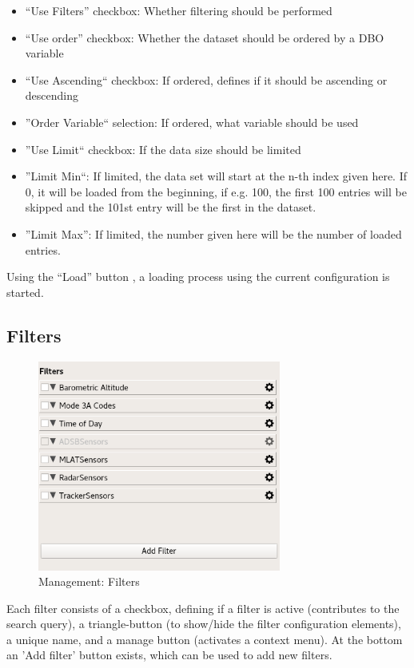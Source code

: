 \documentclass[10pt,letterpaper,extrafontsizes]{memoir}
\begin{document}
\begin{itemize}
 \item ``Use Filters'' checkbox: Whether filtering should be performed
 \item ``Use order'' checkbox: Whether the dataset should be ordered by a DBO variable
 \item ``Use Ascending`` checkbox: If ordered, defines if it should be ascending or descending
 \item ''Order Variable`` selection: If ordered, what variable should be used
 \item ''Use Limit`` checkbox: If the data size should be limited
 \item ''Limit Min``: If limited, the data set will start at the n-th index given here. If 0, it will be loaded from the beginning, if e.g. 100, the first 100 entries will be skipped and the 101st entry will be the first in the dataset.
\item ''Limit Max'': If limited, the number given here will be the number of loaded entries.
\end{itemize}

Using the ``Load'' button , a loading process using the current configuration is started.

\subsection{Filters}

\begin{figure}[H]
  \center
    \includegraphics[width=8cm]{../screenshots/management_filters.png}
  \caption{Management: Filters}
  \label{fig:management_filters}
\end{figure}

Each filter consists of a checkbox, defining if a filter is active (contributes to the search query), a triangle-button (to show/hide the filter configuration elements), a unique name, and a manage button (activates a context menu). At the bottom an 'Add filter' button exists, which can be used to add new filters. \\
\end{document}
